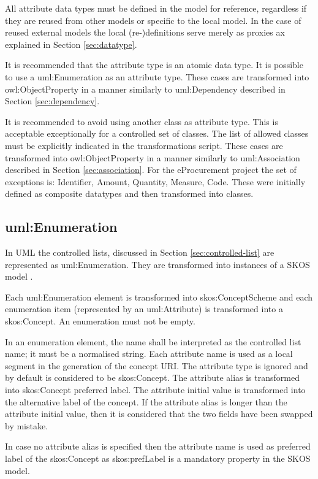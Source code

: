 	All attribute data types must be defined in the model for reference, regardless if they are reused from other models or specific to the local model. In the case of reused external models the local (re-)definitions serve merely as proxies ax explained in Section \ref{sec:datatype}.
	
	It is recommended that the attribute type is an atomic data type. 
	It is possible to use a uml:Enumeration as an attribute type. These cases are transformed into owl:ObjectProperty in a manner similarly to uml:Dependency described in Section \ref{sec:dependency}. 
	
	It is recommended to avoid using another class as attribute type. This is acceptable exceptionally for a controlled set of classes. The list of allowed classes must be explicitly indicated in the transformations script. These cases are transformed into owl:ObjectProperty in a manner similarly to uml:Association described in Section \ref{sec:association}. For the eProcurement project the set of exceptions is: Identifier, Amount, Quantity, Measure, Code. These were initially defined as composite datatypes and then transformed into classes. 
	
	\subsection{uml:Enumeration}
	\label{sec:enumeration}

	In UML the controlled lists, discussed in Section \ref{sec:controlled-list} are represented as uml:Enumeration. They are transformed into instances of a SKOS model \cite{skos-spec}. 
	
	Each uml:Enumeration element is transformed into skos:ConceptScheme and each enumeration item (represented by an uml:Attribute) is transformed into a skos:Concept. An enumeration must not be empty.
	
	In an enumeration element, the name shall be interpreted as the controlled list name; it must be a normalised string. Each attribute name is used as a local segment in the generation of the concept URI. The attribute type is ignored and by default is considered to be skos:Concept. The attribute alias is transformed into skos:Concept preferred label. The attribute initial value is transformed into the alternative label of the concept. If the attribute alias is longer than the attribute initial value, then it is considered that the two fields have been swapped by mistake. 
	
	In case no attribute alias is specified then the attribute name is used as preferred label of the skos:Concept as skos:prefLabel is a mandatory property in the SKOS model.
	
